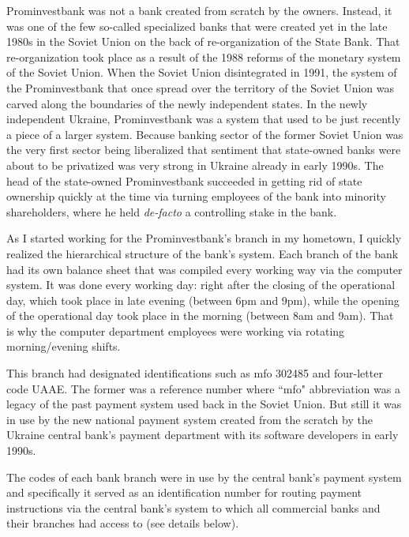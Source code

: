 Prominvestbank was not a bank created from scratch by the owners. Instead, it was one of the few so-called specialized banks that were created yet in the late 1980s in the Soviet Union on the back of re-organization of the State Bank. That re-organization took place as a result of the 1988 reforms of the monetary system of the Soviet Union. When the Soviet Union disintegrated in 1991, the system of the Prominvestbank that once spread over the territory of the Soviet Union was carved along the boundaries of the newly independent states. In the newly independent Ukraine, Prominvestbank was a system that used to be just  recently a piece of a larger system. Because banking sector of the former Soviet Union was the very first sector being liberalized that sentiment that state-owned banks were about to be privatized was very strong in Ukraine already in early 1990s. The head of the state-owned Prominvestbank succeeded in getting rid of state ownership quickly at the time via turning employees of the bank into minority shareholders, where he held \textit{de-facto} a controlling stake in the bank.

As I started working for the Prominvestbank's branch in my hometown, I quickly realized the hierarchical structure of the bank's system. Each branch of the bank had its own balance sheet that was compiled every working way via the computer system. It was done every working day: right after the closing of the operational day, which took place in late evening (between 6pm and 9pm), while the opening of the operational day took place in the morning (between 8am and 9am). That is why the computer department employees were working via rotating morning/evening shifts. 

This branch had designated identifications such as \ac{mfo} 302485 and four-letter code UAAE. The former was a reference number where ``\ac{mfo}" abbreviation was a legacy of the past payment system used back in the Soviet Union. But still it was in use by the new national payment system created from the scratch by the Ukraine central bank's payment department with its software developers in early 1990s. 

The codes of each bank branch were in use by the central bank's payment system and specifically it served as an identification number for routing payment instructions via the central bank's system to which all commercial banks and their branches had access to (see details below).

